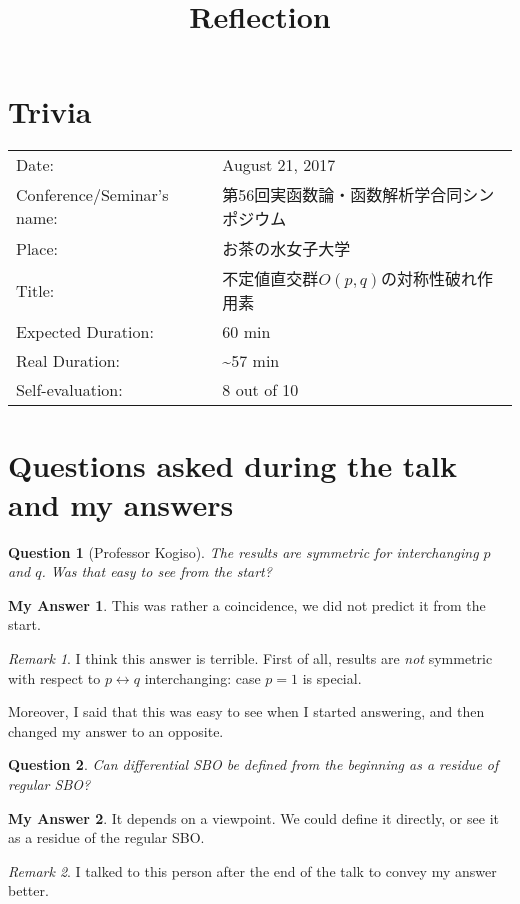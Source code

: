 \documentclass[12pt]{article} %
\title{Reflection}
\theoremstyle{theorem}
\newtheorem{question}{Question}
\theoremstyle{definition}
\newtheorem{answer}{My Answer}
\theoremstyle{remark}
\newtheorem{remark}{Remark}
\begin{document}
	\maketitle

\section{Trivia}
\begin{center}
	\begin{tabular}[]{l|l}
		Date:&August 21, 2017\\
		Conference/Seminar's name:& 第56回実函数論・函数解析学合同シンポジウム\\
		Place:& お茶の水女子大学\\
		Title:&{不定値直交群$O(p,q)$の対称性破れ作用素}\\
		Expected Duration:&60 min\\
		Real Duration:& \textasciitilde 57 min\\
		Self-evaluation:& 8 out of 10\\
	\end{tabular}
\end{center}
\section{Questions asked during the talk and my answers}
\begin{question}[Professor Kogiso]
    The results are symmetric for interchanging $p$ and $q$. Was that easy to see from the start?
\end{question}
\begin{answer}
    This was rather a coincidence, we did not predict it from the start.
\end{answer}
\begin{remark}
    I think this answer is terrible. First of all, results are \textit{not} symmetric
    with respect to $p\leftrightarrow q$ interchanging: case $p=1$ is special.

    Moreover, I said that this was easy to see when I started answering, and then changed my answer to an opposite.
\end{remark}
\begin{question}
    Can differential SBO be defined from the beginning as a residue of regular SBO?
\end{question}
\begin{answer}
    It depends on a viewpoint. We could define it directly, or see it as a residue of the regular SBO.
\end{answer}
\begin{remark}
    I talked to this person after the end of the talk to convey my answer better.
\end{remark}
\end{document}

